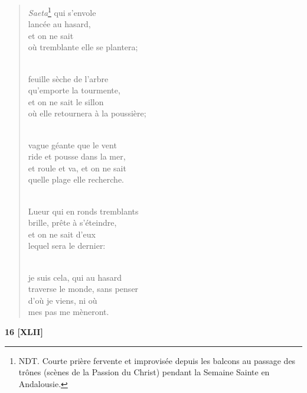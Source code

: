 \documentclass[a4paper,11pt]{book}
\begin{document}
\begin{verse}
{\em Saeta}\footnote{NDT. Courte prière fervente et improvisée depuis les balcons au passage des trônes (scènes de la Passion du Christ) pendant la Semaine Sainte en Andalousie.} qui s'envole \\
lancée au hasard, \\
et on ne sait \\
où tremblante elle se plantera; \\ \

feuille sèche de l'arbre \\
qu'emporte la tourmente, \\
et on ne sait le sillon \\
où elle retournera à la poussière; \\ \

vague géante que le vent \\
ride et pousse dans la mer, \\
et roule et va, et on ne sait \\
quelle plage elle recherche. \\ \

\newpage

Lueur qui en ronds tremblants \\
brille, prête à s'éteindre, \\
et on ne sait d'eux \\
lequel sera le dernier: \\ \

je suis cela, qui au hasard \\
traverse le monde, sans penser \\
d'où je viens, ni où \\
mes pas me mèneront. \\
\end{verse}

\bigskip

\begin{center} {\bf 16 [XLII]} \end{center}
\end{document}
